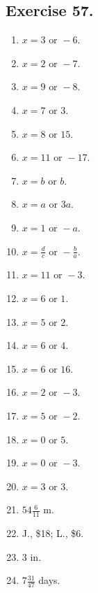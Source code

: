 \documentclass{book}
\begin{document}
\subsection*{Exercise 57.}


\begin{enumerate}
\item $x = 3 \text{ or } -6$.

\item $x = 2 \text{ or } -7$.

\item $x = 9 \text{ or } -8$.

\item $x = 7 \text{ or } 3$.

\item $x = 8 \text{ or } 15$.

\item $x = 11 \text{ or } -17$.

\item $x = b \text{ or } b$.

\item $x = a \text{ or } 3a$.

\item $x = 1 \text{ or } -a$.

\item $x = \frac{d}{c} \text{ or } -\frac{b}{a}$.

\item $x = 11 \text{ or } -3$.

\item $x = 6 \text{ or } 1$.

\item $x = 5 \text{ or } 2$.

\item $x = 6 \text{ or } 4$.

\item $x = 6 \text{ or } 16$.

\item $x = 2 \text{ or } -3$.

\item $x = 5 \text{ or } -2$.

\item $x = 0 \text{ or } 5$.

\item $x = 0 \text{ or } -3$.

\item $x = 3 \text{ or } 3$.

\item $54\frac{6}{11}$ m.

\item J., \$18; L., \$6.

\item $3$ in.

\item $7\frac{31}{47}$ days.
\end{enumerate}
\end{document}
